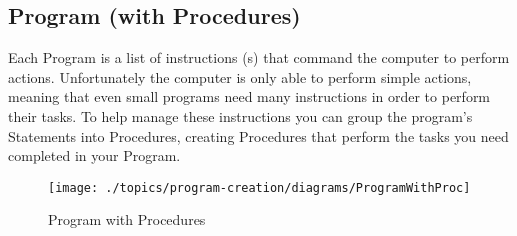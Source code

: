 \clearpage
\subsection{Program (with Procedures)} %
\label{sub:program_with_procedures_}

Each Program is a list of instructions (s) that command the computer to perform actions. Unfortunately the computer is only able to perform simple actions, meaning that even small programs need many instructions in order to perform their tasks. To help manage these instructions you can group the program's Statements into Procedures, creating Procedures that perform the tasks you need completed in your Program.

\begin{figure}[h]
   \centering
   \texttt{[image: ./topics/program-creation/diagrams/ProgramWithProc]} 
   \caption{Program with Procedures}
   \label{fig:procedure-decl-program}
\end{figure}


